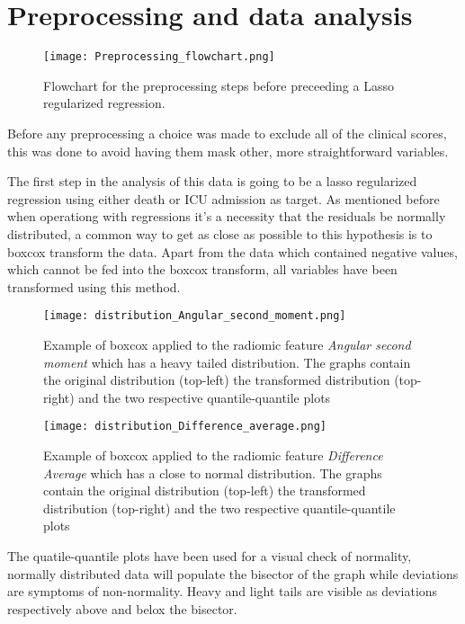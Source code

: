 \section{Preprocessing and data analysis}
\begin{figure}
\texttt{[image: Preprocessing\_flowchart.png]}
\caption{Flowchart for the preprocessing steps before preceeding a Lasso regularized regression. \label{fig:preprocFlowchart}}
\end{figure}

Before any preprocessing a choice was made to exclude all of the clinical scores, this was done to avoid having them mask other, more straightforward variables.

The first step in the analysis of this data is going to be a lasso regularized regression using either death or ICU admission as target. As mentioned before when operationg with regressions it's a necessity that the residuals be normally distributed, a common way to get as close as possible to this hypothesis is to boxcox transform the data. Apart from the data which contained negative values, which cannot be fed into the boxcox transform, all variables have been transformed using this method.

\begin{figure}[htbp]
  		\texttt{[image: distribution\_Angular\_second\_moment.png]}
        \caption{Example of boxcox applied to the radiomic feature \textit{Angular second moment} which has a heavy tailed distribution. The graphs contain the original distribution (top-left) the transformed distribution (top-right) and the two respective quantile-quantile plots \label{fig:boxcox_example}}
\end{figure}

\begin{figure}[htbp]
  		\texttt{[image: distribution\_Difference\_average.png]}
        \caption{Example of boxcox applied to the radiomic feature \textit{Difference Average} which has a close to normal distribution. The graphs contain the original distribution (top-left) the transformed distribution (top-right) and the two respective quantile-quantile plots \label{fig:boxcox_example_normal}}
\end{figure}

The quatile-quantile plots have been used for a visual check of normality, normally distributed data will populate the bisector of the graph while deviations are symptoms of non-normality. Heavy and light tails are visible as deviations respectively above and belox the bisector.

